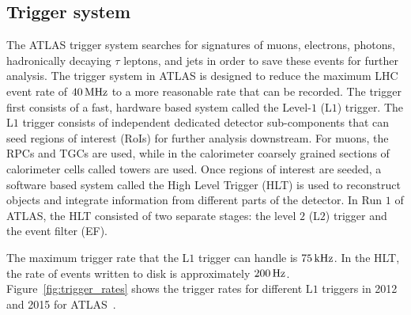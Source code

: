 \subsection{Trigger system}

The ATLAS trigger system searches for signatures of muons, electrons, photons, hadronically decaying $\tau$ leptons, and jets in order to save these events for further analysis. The trigger system in ATLAS is designed to reduce the maximum LHC event rate of $40\,\rm MHz$ to a more reasonable rate that can be recorded. The trigger first consists of a fast, hardware based system called the Level-$1$ (L$1$) trigger. The L$1$ trigger consists of independent dedicated detector sub-components that can seed regions of interest (RoIs) for further analysis downstream. For muons, the RPCs and TGCs are used, while in the calorimeter coarsely grained sections of calorimeter cells called towers are used. Once regions of interest are seeded, a software based system called the High Level Trigger (HLT) is used to reconstruct objects and integrate information from different parts of the detector. In Run $1$ of ATLAS, the HLT consisted of two separate stages: the level $2$ (L$2$) trigger and the event filter (EF). 

The maximum trigger rate that the L$1$ trigger can handle is $75\,\rm kHz$. In the HLT, the rate of events written to disk is approximately $200\, \rm Hz$. Figure~\ref{fig:trigger_rates} shows the trigger rates for different L$1$ triggers in 2012 and 2015 for ATLAS~\cite{TriggerOps}. 

